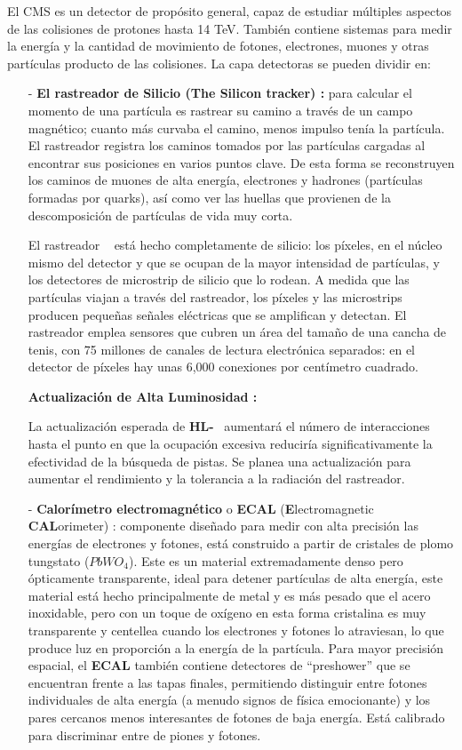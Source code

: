 El CMS es un detector de propósito general, capaz de estudiar múltiples aspectos de las colisiones de protones hasta 14 TeV. También contiene sistemas para medir la energía y la cantidad de movimiento de fotones, electrones, muones y otras partículas producto de las colisiones. La capa detectoras se pueden dividir en: 
\begin{itemize}
\item[-]  \textbf{El rastreador de Silicio (The Silicon tracker) :} para calcular el momento de una partícula es rastrear su camino a través de un campo magnético; cuanto más curvaba el camino, menos impulso tenía la partícula. El rastreador \CMS registra los caminos tomados por las partículas cargadas al encontrar sus posiciones en varios puntos clave. De esta forma se reconstruyen los caminos de muones de alta energía, electrones y hadrones (partículas formadas por quarks), así como ver las huellas que provienen de la descomposición de partículas de vida muy corta.

El rastreador \CMS ~ está hecho completamente de silicio: los píxeles, en el núcleo mismo del detector y que se ocupan de la mayor intensidad de partículas, y los detectores de microstrip de silicio que lo rodean. A medida que las partículas viajan a través del rastreador, los píxeles y las microstrips producen pequeñas señales eléctricas que se amplifican y detectan. El rastreador emplea sensores que cubren un área del tamaño de una cancha de tenis, con 75 millones de canales de lectura electrónica separados: en el detector de píxeles hay unas 6,000 conexiones por centímetro cuadrado.

\textbf{Actualización de Alta Luminosidad : }

La actualización esperada de \textbf{HL-}\LHC~ aumentará el número de interacciones hasta el punto en que la ocupación excesiva reduciría significativamente la efectividad de la búsqueda de pistas. Se planea una actualización para aumentar el rendimiento y la tolerancia a la radiación del rastreador.

\item[-] \textbf{Calorímetro electromagnético} o \textbf{ECAL} (\textbf{E}lectromagnetic \textbf{CAL}orimeter) : componente diseñado para medir con alta precisión las energías de electrones y fotones, está construido a partir de cristales de plomo tungstato ($PbWO_4$). Este es un material extremadamente denso pero ópticamente transparente, ideal para detener partículas de alta energía, este material está hecho principalmente de metal y es más pesado que el acero inoxidable, pero con un toque de oxígeno en esta forma cristalina es muy transparente y centellea cuando los electrones y fotones lo atraviesan, lo que produce luz en proporción a la energía de la partícula. Para mayor precisión espacial, el \textbf{ECAL} también contiene detectores de ``preshower'' que se encuentran frente a las tapas finales, permitiendo distinguir entre fotones individuales de alta energía (a menudo signos de física emocionante) y los pares cercanos menos interesantes de fotones de baja energía. Está calibrado para discriminar entre de piones y fotones.


\end{itemize}
